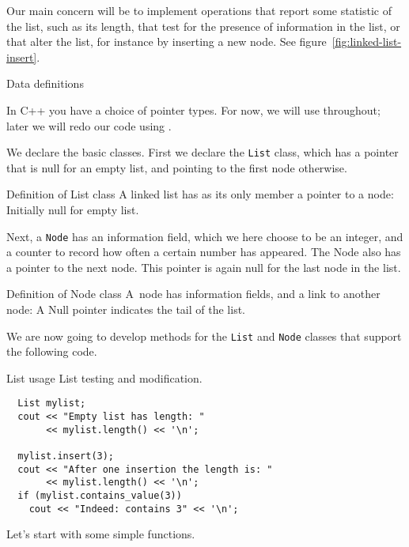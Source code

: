 Our main concern will be to implement operations that report some
statistic of the list, such as its length, that test for the presence
of information in the list, or that alter the list, for
instance by inserting a new node. See figure~\ref{fig:linked-list-insert}.

 {Data definitions}

In C++ you have a choice of pointer types. For now, we will use
 throughout; later we will redo our code
using .

We declare the basic classes.
First we declare the \lstinline{List} class,
which has a pointer that is null for an empty list,
and pointing to the first node otherwise.

\begin{block}{Definition of List class}
  \label{sl:list-class}
  A linked list has as its only member a pointer to a node:
  Initially null for empty list.
\end{block}

Next, a \lstinline{Node} has an information field, which we here choose to be an integer,
and a counter to record how often a certain number has appeared.
The Node also has a pointer to the next node.
This pointer is again null for the last node
in the list.

\begin{block}{Definition of Node class}
  \label{sl:node-class}
  A~node has information fields, and a
  link to another node:
  A Null pointer indicates the tail of the list.
\end{block}

We are now going to develop methods for the \lstinline{List} and \lstinline{Node}
classes that support the following code.

\begin{block}{List usage}
  \label{sl:list-node-funcs}
  List testing and modification.
\begin{lstlisting}
  List mylist;
  cout << "Empty list has length: "
       << mylist.length() << '\n';

  mylist.insert(3);
  cout << "After one insertion the length is: "
       << mylist.length() << '\n';
  if (mylist.contains_value(3))
    cout << "Indeed: contains 3" << '\n';
\end{lstlisting}
\end{block}

Let's start with some simple functions.

